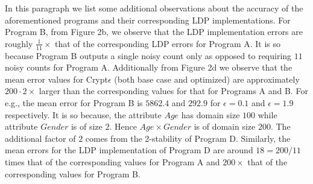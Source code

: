 In this paragraph we list some additional observations about the accuracy of the aforementioned \system programs and their corresponding \textsf{LDP} implementations.  For Program B, from Figure 2b, we observe that the \textsf{LDP} implementation errors  are roughly $\frac{1}{11}\times$ that of the corresponding \textsf{LDP} errors for Program A. It is so because Program B outputs a single noisy count only as opposed to requiring $11$ noisy counts for Program A. Additionally from Figure 2d we observe that the mean error values for Crypt$\epsilon$ (both base case and optimized) are approximately $200\cdot 2 \times $ larger than the corresponding values for that for Programs A and B. For e.g., the mean error for Program B is $5862.4$ and $292.9$ for $\epsilon=0.1$ and $\epsilon=1.9$ respectively. It is so because, the attribute $Age$ has domain size $100$ while attribute $Gender$ is of size $2$. Hence $Age\times Gender$ is of domain size $200$. The additional factor of $2$ comes from the 2-stability of Program D. Similarly, the mean errors for the \textsf{LDP} implementation of Program D are around $18 = 200/11$ times that of the corresponding values for Program A and $200\times$ that of the corresponding values for Program B.
